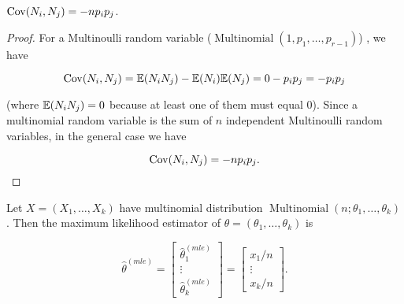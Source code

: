 \begin{proposition} \(\mathrm{Cov}(N_i, N_j) =  -np_ip_j \).

\end{proposition}

\begin{proof} For a Multinoulli random variable (\(\operatorname{Multinomial}(1,p_1, \ldots, p_{r-1})\)) , we have 

\[
\mathrm{Cov}(N_i, N_j) = \mathbb{E}(N_iN_j) - \mathbb{E}(N_i)\mathbb{E}(N_j) =  0- p_i p_j  = -p_ip_j
\]

(where \(\mathbb{E}(N_i N_j) =0\) because at least one of them must equal 0). Since a multinomial random variable is the sum of \(n\) independent Multinoulli random variables, in the general case we have

\[
\mathrm{Cov}(N_i, N_j) = -np_ip_j.
\]

\end{proof}

\begin{proposition} Let \(X= (X_1, \ldots, X_k)\) have multinomial distribution \(\operatorname{Multinomial}(n; \theta_1, \ldots, \theta_k)\). Then the maximum likelihood estimator of \(\theta = (\theta_1, \ldots, \theta_k)\) is 

\[
 \hat{\theta}^{(mle)} = \begin{bmatrix}
 \hat{\theta}_1^{(mle)}  \\
 \vdots \\
  \hat{\theta}_k^{(mle)} 
  \end{bmatrix} = \begin{bmatrix}
x_1/n \\
  \vdots \\
 x_k/n
  \end{bmatrix}.
\]

\end{proposition}

